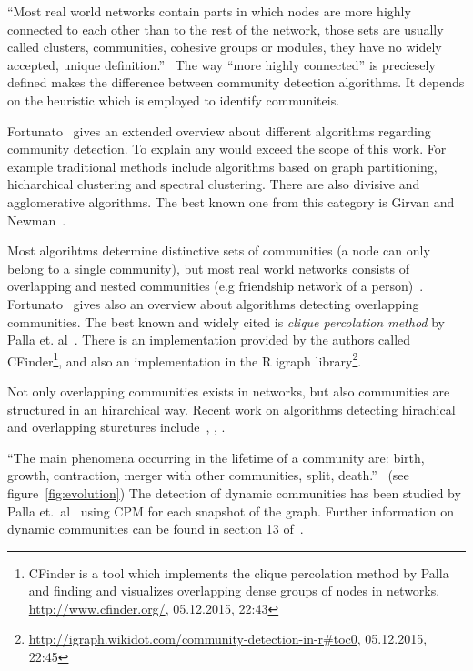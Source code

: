 \documentclass[runningheads,a4paper]{llncs}
\begin{document}
``Most real world networks contain parts in which nodes are more highly connected to each other than to the rest of the network, those sets are usually called clusters, communities, cohesive groups or modules, they have no widely accepted, unique definition.''~\cite{palla2005uncovering}
The way ``more highly connected'' is preciesely defined makes the difference between community detection algorithms.
It depends on the heuristic which is employed to identify communiteis.~\cite{porter2009communities}

Fortunato~\cite{fortunato2010community} gives an extended overview about different algorithms regarding community detection.
To explain any would exceed the scope of this work.
For example traditional methods include algorithms based on graph partitioning, hicharchical clustering and spectral clustering.
There are also divisive and agglomerative algorithms.
The best known one from this category is Girvan and Newman~\cite{girvan2002community}.

Most algorihtms determine distinctive sets of communities (a node can only belong to a single community), but most real world networks  consists of overlapping and nested communities (e.g friendship network of a person)~\cite{palla2005uncovering}.
Fortunato~\cite{fortunato2010community} gives also an overview about algorithms detecting overlapping communities.
The best known and widely cited is \emph{clique percolation method} by Palla et. al~\cite{palla2005uncovering}.
There is an implementation provided by the authors called CFinder\footnote{CFinder is a tool which implements the clique percolation method by Palla and finding and visualizes overlapping dense groups of nodes in networks. \url{http://www.cfinder.org/}, 05.12.2015, 22:43}, and also an implementation in the R igraph library\footnote{\url{http://igraph.wikidot.com/community-detection-in-r#toc0}, 05.12.2015, 22:45}.

Not only overlapping communities exists in networks, but also communities are structured in an hirarchical way.
Recent work on algorithms detecting hirachical and overlapping sturctures  include~\cite{1367-2630-11-3-033015}, \cite{Cui201485}, \cite{Shen20091706}.

``The main phenomena occurring in the lifetime of a community are: birth, growth, contraction, merger with other communities, split, death.''~\cite{fortunato2010community} (see figure~\ref{fig:evolution})
The detection of dynamic communities has been studied by Palla et.~al~\cite{palla2007quantifying} using CPM for each snapshot of the graph. Further information on dynamic communities can be found in section 13 of~\cite{fortunato2010community}.
\end{document}
